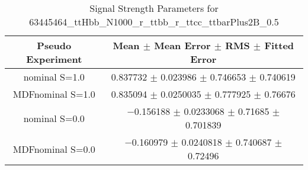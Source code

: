 \begin{table}
\centering
\caption{Signal Strength Parameters for 63445464\_ttHbb\_N1000\_r\_ttbb\_r\_ttcc\_ttbarPlus2B\_0.5}
\begin{tabular}{cc}
\toprule
Pseudo Experiment & Mean $\pm$ Mean Error $\pm$ RMS $\pm$ Fitted Error\\
\midrule
nominal S=1.0 & \num{0.837732} $\pm$ \num{0.023986} $\pm$ \num{0.746653} $\pm$ \num{0.740619}\\
MDFnominal S=1.0 & \num{0.835094} $\pm$ \num{0.0250035} $\pm$ \num{0.777925} $\pm$ \num{0.76676}\\
nominal S=0.0 & \num{-0.156188} $\pm$ \num{0.0233068} $\pm$ \num{0.71685} $\pm$ \num{0.701839}\\
MDFnominal S=0.0 & \num{-0.160979} $\pm$ \num{0.0240818} $\pm$ \num{0.740687} $\pm$ \num{0.72496}\\
\bottomrule
\end{tabular}
\end{table}